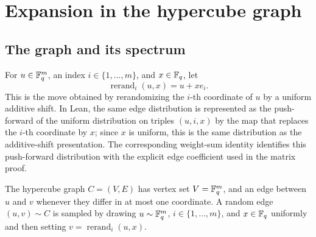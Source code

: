 \chapter{Expansion in the hypercube graph}
\label{chap:expansion}
\label{sec:expansion}

\section{The graph and its spectrum}


\begin{definition}\label{def:rerandomize-coord}
	\leanok
	For $u \in \mathbb{F}_q^m$, an index $i \in \{1,\dots,m\}$, and $x \in \mathbb{F}_q$, let
	\[
		\operatorname{rerand}_i(u,x) = u + x e_i.
	\]
	This is the move obtained by rerandomizing the $i$-th coordinate of $u$ by a uniform additive shift.
	In Lean, the same edge distribution is represented as the push-forward of the uniform distribution
	on triples $(u,i,x)$ by the map that replaces the $i$-th coordinate by $x$; since $x$ is uniform,
	this is the same distribution as the additive-shift presentation.  The corresponding
	weight-sum identity identifies this push-forward distribution with the explicit edge
	coefficient used in the matrix proof.
\end{definition}

\begin{definition}\label{def:hypercube-graph}
	\leanok
	The hypercube graph $C=(V,E)$ has vertex set $V=\mathbb{F}_q^m$, and an edge between $u$ and $v$ whenever they differ in at most one coordinate. A random edge $(u,v) \sim C$ is sampled by drawing $u \sim \mathbb{F}_q^m$, $i \in \{1,\dots,m\}$, and $x \in \mathbb{F}_q$ uniformly and then setting $v=\operatorname{rerand}_i(u,x)$.
\end{definition}

